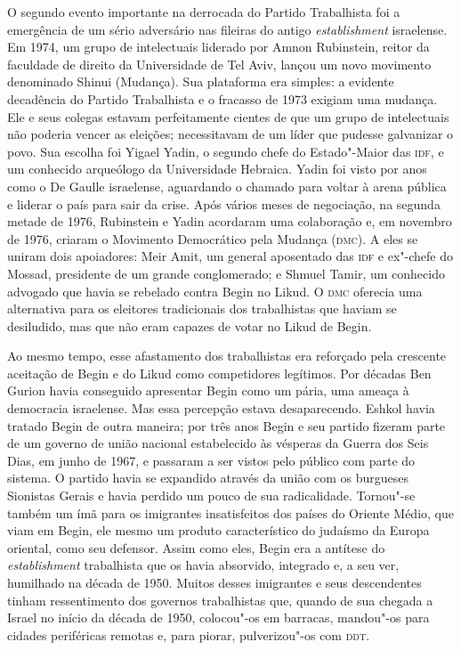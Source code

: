 O segundo evento importante na derrocada do Partido Trabalhista foi a
emergência de um sério adversário nas fileiras do antigo
\emph{establishment} israelense. Em 1974, um grupo de intelectuais
liderado por Amnon Rubinstein, reitor da faculdade de direito da
Universidade de Tel Aviv, lançou um novo movimento denominado Shinui
(Mudança). Sua plataforma era simples: a evidente decadência do Partido
Trabalhista e o fracasso de 1973 exigiam uma mudança. Ele e seus
colegas estavam perfeitamente cientes de que um grupo de intelectuais não
poderia vencer as eleições; necessitavam de um líder que pudesse
galvanizar o povo. Sua escolha foi Yigael Yadin, o segundo chefe do
Estado"-Maior das \textsc{idf}, e um conhecido arqueólogo da Universidade
Hebraica. Yadin foi visto por anos como o De Gaulle israelense,
aguardando o chamado para voltar à arena pública e liderar o país para
sair da crise. Após vários meses de negociação, na segunda metade de
1976, Rubinstein e Yadin acordaram uma colaboração e, em novembro de
1976, criaram o Movimento Democrático pela Mudança (\textsc{dmc}). A eles se
uniram dois apoiadores: Meir Amit, um general aposentado das \textsc{idf} e
ex"-chefe do Mossad, presidente de um grande conglomerado; e Shmuel
Tamir, um conhecido advogado que havia se rebelado contra Begin no
Likud. O \textsc{dmc} oferecia uma alternativa para os eleitores tradicionais dos
trabalhistas que haviam se desiludido, mas que não eram capazes de votar
no Likud de Begin.

Ao mesmo tempo, esse afastamento dos trabalhistas era reforçado pela
crescente aceitação de Begin e do Likud como competidores legítimos. Por
décadas Ben Gurion havia conseguido apresentar Begin como um pária,
uma ameaça à democracia israelense. Mas essa percepção estava
desaparecendo. Eshkol havia tratado Begin de outra maneira; por três
anos Begin e seu partido fizeram parte de um governo de união nacional
estabelecido às vésperas da Guerra dos Seis Dias, em junho de 1967, e
passaram a ser vistos pelo público com parte do sistema. O partido havia
se expandido através da união com os burgueses Sionistas Gerais e havia
perdido um pouco de sua radicalidade. Tornou"-se também um ímã para os
imigrantes insatisfeitos dos países do Oriente Médio, que viam em Begin,
ele mesmo um produto característico do judaísmo da Europa oriental, como
seu defensor. Assim como eles, Begin era a antítese do
\emph{establishment} trabalhista que os havia absorvido, integrado e, a
seu ver, humilhado na década de 1950. Muitos desses imigrantes e seus
descendentes tinham ressentimento dos governos trabalhistas que, quando
de sua chegada a Israel no início da década de 1950, colocou"-os em
barracas, mandou"-os para cidades periféricas remotas e, para piorar,
pulverizou"-os com \textsc{ddt}.

